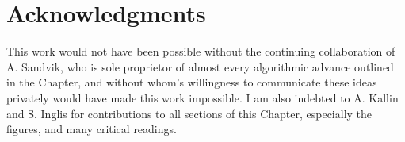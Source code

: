 \documentclass[vecphys]{svmult}
\begin{document}
\section{Acknowledgments}  
This work would not have been possible without the continuing collaboration of A. Sandvik, who is sole proprietor of almost every algorithmic advance outlined in the Chapter, and without whom's willingness to communicate these ideas privately would have made this work impossible.
I am also indebted to A. Kallin and S. Inglis for contributions to all sections of this Chapter, especially the figures, and many critical readings.

 
 
%
%


\printindex
\end{document}
